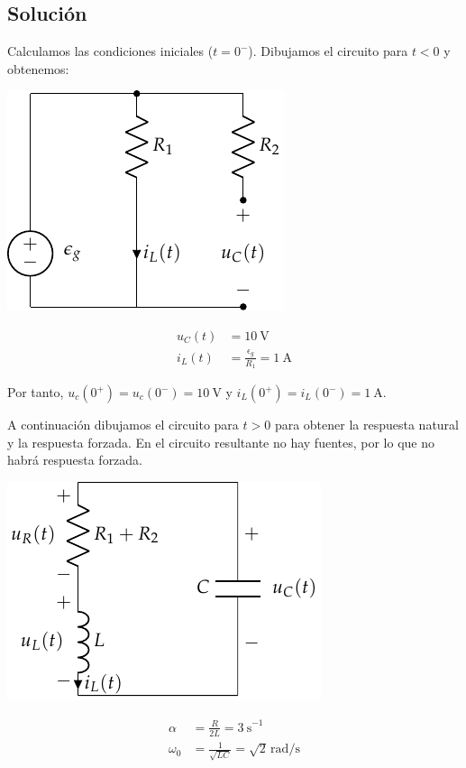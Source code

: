 \subsection*{Solución}

Calculamos las condiciones iniciales ($t = 0^-$). Dibujamos el circuito para $t < 0$ y obtenemos:

\vspace{3mm}
\begin{minipage}{0.3\textwidth}
  \includegraphics{figuras/FM_4_8_t0-}
\end{minipage}
\begin{minipage}{0.7\textwidth}
  \begin{align*}
    u_C(t) &= \SI{10}{\volt}\\
    i_L(t) &= \frac{\epsilon_g}{R_1} = \SI{1}{\ampere}
  \end{align*}
\end{minipage}

\vspace{4mm}
Por tanto, $u_c(0^+) = u_c(0^-) = \SI{10}{\volt}$ y
$i_L(0^+) = i_L(0^-) = \SI{1}{\ampere}$.

\vspace{3mm}
A continuación dibujamos el circuito para $t > 0$ para obtener la
respuesta natural y la respuesta forzada. En el circuito resultante no
hay fuentes, por lo que no habrá respuesta forzada.

\vspace{3mm}
\begin{minipage}{0.3\textwidth}
  \includegraphics{figuras/FM_4_8_natural}
\end{minipage}
\begin{minipage}{0.7\textwidth}
  \begin{align*}
    \alpha &= \frac{R}{2L} = \SI{3}{\second}^{-1}\\
    \omega_0 &= \frac{1}{\sqrt{LC}} = \sqrt{2}\,\si{\radian\per\second}
  \end{align*}
\end{minipage}

